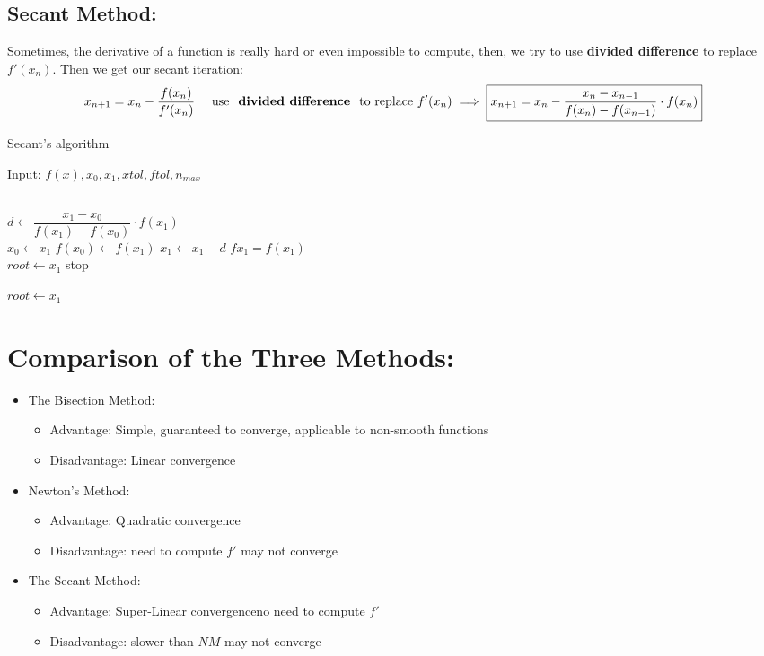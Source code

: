 \documentclass [9 pt]{article}
\theoremstyle{definition}
\begin{document}
\newpage
\subsection*{Secant Method:}
Sometimes, the derivative of a function is really hard or even impossible to compute, then, we try to use \textbf{ divided difference } to replace $f'(x_n)$. Then we get our secant iteration:
$$ x_{n+1} = x_n - \dfrac{f(x_n)}{f'(x_n)} \quad\text{ use \textbf{ divided difference } to replace $f'(x_n)$} \implies \boxed{  x_{n+1} = x_n - \dfrac{x_n - x_{n - 1}}{f(x_n) - f(x_{n - 1})} \cdot f(x_n) } $$
\begin{algorithm}
\caption{Secant's algorithm}

\begin{algorithmic}[1]
\State Input: $f(x) , x_0, x_1, xtol, ftol, n_{max} $ 
\State {}

	\\
		\State $d \gets \dfrac{x_1 - x_0}{f(x_1) - f(x_0)} \cdot f(x_1)  $ 
		\\
		\State $x_0 \gets x_1 $
		\State $f(x_0) \gets f(x_1)$
		\State $x_1 \gets x_1 - d$
		\State $fx_1 = f(x_1) $
		\\
			\State $root \gets x_1$
			\State stop
		\EndIf
	\\
	\EndFor	
	
	\State $root \gets x_1$


\end{algorithmic}
\end{algorithm}

\section*{Comparison of the Three Methods:}
\begin{itemize}
	\item The Bisection Method:
		\begin{itemize}
			\item Advantage: Simple, guaranteed to converge, applicable to non-smooth functions
			\item Disadvantage: Linear convergence
		\end{itemize}
	\item Newton's Method:
		\begin{itemize}
			\item Advantage: Quadratic convergence
			\item Disadvantage: need to compute $f'$ \quad may not converge
		\end{itemize}
	\item The Secant Method:
		\begin{itemize}
			\item Advantage: Super-Linear convergence\quad no need to compute $f'$
			\item Disadvantage: slower than $NM$ \quad may not converge
		\end{itemize}
\end{itemize}
\end{document}
